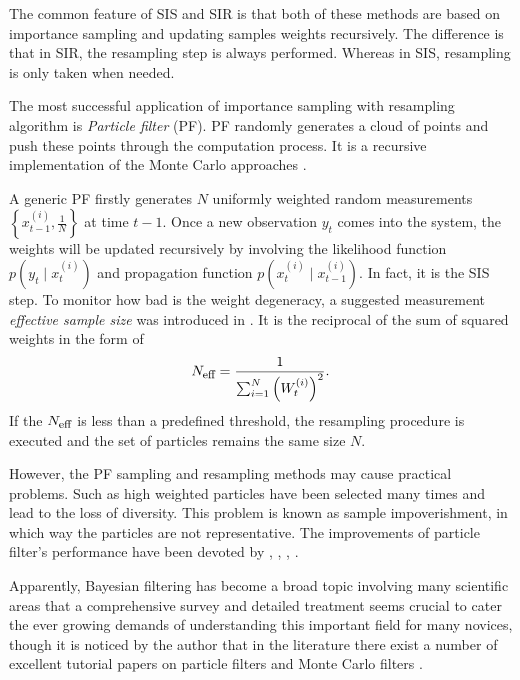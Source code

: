 The common feature of SIS and SIR is that both of these methods are based on importance sampling and updating samples weights recursively. The difference is that in SIR, the resampling step is always performed. Whereas in SIS, resampling is only taken when needed. 


The most successful application of importance sampling with resampling algorithm is \textit{Particle filter} (PF). PF randomly generates a cloud of points and push these points through the computation process. It is a recursive implementation of the Monte Carlo approaches \cite{doucet2009tutorial}. 


A generic PF firstly generates $N$ uniformly weighted random measurements $\left\lbrace x_{t-1}^{(i)},\frac{1}{N} \right\rbrace$ at time $t-1$. Once a new observation $y_t$ comes into the system, the weights will be updated recursively by involving the likelihood function $p(y_t\mid x_t^{(i)})$ and propagation function $p(x_t^{(i)}\mid x_{t-1}^{(i)})$. In fact, it is the SIS step. To monitor how bad is the weight degeneracy, a suggested measurement \textit{effective sample size} was introduced in \cite{kong1994sequential}. It is the reciprocal of the sum of squared weights in the form of 
\begin{equation*}
N_{\mbox{\footnotesize eff}} = \frac{1}{\sum_{i=1}^{N}\left(W_t^{(i)} \right)^2}. 
\end{equation*}
If the $N_{\mbox{\footnotesize eff}}$ is less than a predefined threshold, the resampling procedure is executed and the set of particles remains the same size $N$. 



However, the PF sampling and resampling methods may cause practical problems. Such as high weighted particles have been selected many times and lead to the loss of diversity. This problem is known as sample impoverishment, in which way the particles are not representative. The improvements of particle filter's performance have been devoted by \cite{carpenter1999improved}, \cite{godsill2001maximum}, \cite{stavropoulos2001improved}, \cite{smcmip2011}. 


Apparently, Bayesian filtering has become a broad topic involving many scientific areas that a comprehensive survey and detailed treatment seems crucial to cater the ever growing demands of understanding this important field for many novices, though it is noticed by the author that in the literature there exist a number of excellent tutorial papers on particle filters and Monte Carlo filters \cite{chen2003bayesian} \cite{doucet2000sequential} \cite{doucet2000rao} \cite{chen2012monte}.  
 



